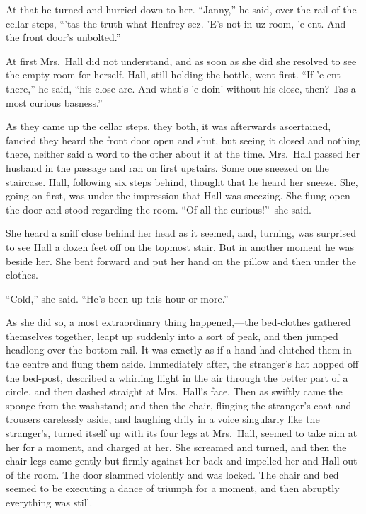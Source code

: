 At that he turned and hurried down to her. “Janny,” he said, over the rail of the cellar steps, “\kern1pt’tas the truth what Henfrey sez. ’E’s not in uz room, ’e ent. And the front door’s unbolted.”

At first Mrs.\ Hall did not understand, and as soon as she did she resolved to see the empty room for herself. Hall, still holding the bottle, went first. “If ’e ent there,” he said, “his close are. And what’s ’e doin’ without his close, then? Tas a most curious basness.”

As they came up the cellar steps, they both, it was afterwards ascertained, fancied they heard the front door open and shut, but seeing it closed and nothing there, neither said a word to the other about it at the time. Mrs.\ Hall passed her husband in the passage and ran on first upstairs. Some one sneezed on the staircase. Hall, following six steps behind, thought that he heard her sneeze. She, going on first, was under the impression that Hall was sneezing. She flung open the door and stood regarding the room. “Of all the curious!”\ she said.

She heard a sniff close behind her head as it seemed, and, turning, was surprised to see Hall a dozen feet off on the topmost stair. But in another moment he was beside her. She bent forward and put her hand on the pillow and then under the clothes.

“Cold,” she said. “He’s been up this hour or more.”

As she did so, a most extraordinary thing happened,—the bed-clothes gathered themselves together, leapt up suddenly into a sort of peak, and then jumped headlong over the bottom rail. It was exactly as if a hand had clutched them in the centre and flung them aside. Immediately after, the stranger’s hat hopped off the bed-post, described a whirling flight in the air through the better part of a circle, and then dashed straight at Mrs.\ Hall’s face. Then as swiftly came the sponge from the washstand; and then the chair, flinging the stranger’s coat and trousers carelessly aside, and laughing drily in a voice singularly like the stranger’s, turned itself up with its four legs at Mrs.\ Hall, seemed to take aim at her for a moment, and charged at her. She screamed and turned, and then the chair legs came gently but firmly against her back and impelled her and Hall out of the room. The door slammed violently and was locked. The chair and bed seemed to be executing a dance of triumph for a moment, and then abruptly everything was still.

